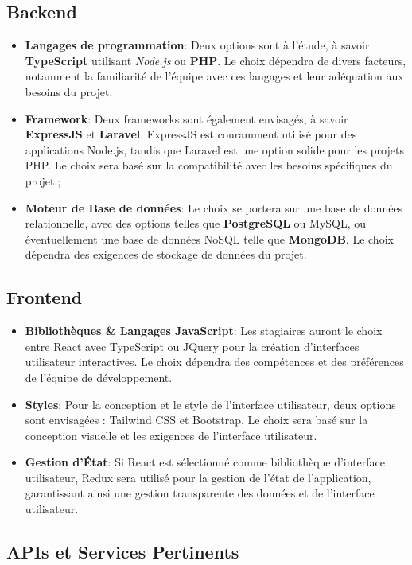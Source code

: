 {\subsection{Backend}
\begin{itemize}
    \item \textbf{Langages de programmation}: Deux options sont à l'étude, à savoir \textbf{TypeScript} utilisant \textit{Node.js} ou \textbf{PHP}. Le choix dépendra de divers facteurs, notamment la familiarité de l'équipe avec ces langages et leur adéquation aux besoins du projet.
    \item \textbf{Framework}: Deux frameworks sont également envisagés, à savoir \textbf{ExpressJS} et \textbf{Laravel}. ExpressJS est couramment utilisé pour des applications Node.js, tandis que Laravel est une option solide pour les projets PHP. Le choix sera basé sur la compatibilité avec les besoins spécifiques du projet.;
    \item \textbf{Moteur de Base de données}: Le choix se portera sur une base de données relationnelle, avec des options telles que \textbf{PostgreSQL} ou MySQL, ou éventuellement une base de données NoSQL telle que \textbf{MongoDB}. Le choix dépendra des exigences de stockage de données du projet.
\end{itemize}

\subsection{Frontend}
\begin{itemize}
    \item \textbf{Bibliothèques \& Langages JavaScript}: Les stagiaires auront le choix entre React avec TypeScript ou JQuery pour la création d'interfaces utilisateur interactives. Le choix dépendra des compétences et des préférences de l'équipe de développement.
    \item \textbf{Styles}: Pour la conception et le style de l'interface utilisateur, deux options sont envisagées : Tailwind CSS et Bootstrap. Le choix sera basé sur la conception visuelle et les exigences de l'interface utilisateur.
    \item \textbf{Gestion d'État}: Si React est sélectionné comme bibliothèque d'interface utilisateur, Redux sera utilisé pour la gestion de l'état de l'application, garantissant ainsi une gestion transparente des données et de l'interface utilisateur.
\end{itemize}

\subsection{APIs et Services Pertinents }

}
